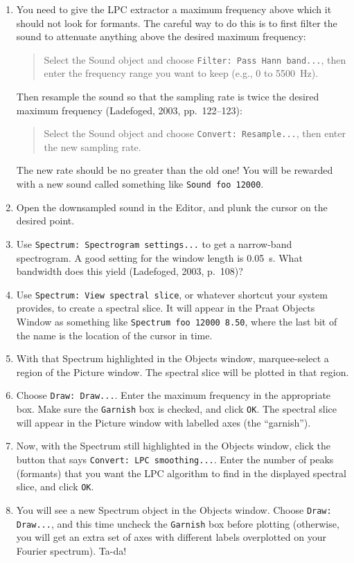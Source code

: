 \documentclass[12pt, letterpaper]{article}
\begin{document}
\begin{enumerate}[label=\arabic*.]
    \item You need to give the LPC extractor a maximum frequency above which it should not look for formants. The careful way to do this is to first filter the sound to attenuate anything above the desired maximum frequency:
    \begin{quote}
    Select the Sound object and choose \texttt{Filter: Pass Hann band...}, then enter the frequency range you want to keep (e.g., 0 to 5500~Hz).
    \end{quote}
    Then resample the sound so that the sampling rate is twice the desired maximum frequency (Ladefoged, 2003, pp.~122–123):
    \begin{quote}
    Select the Sound object and choose \texttt{Convert: Resample...}, then enter the new sampling rate.
    \end{quote}
    The new rate should be no greater than the old one! You will be rewarded with a new sound called something like \texttt{Sound foo 12000}.

    \item Open the downsampled sound in the Editor, and plunk the cursor on the desired point.

    \item Use \texttt{Spectrum: Spectrogram settings...} to get a narrow-band spectrogram. A good setting for the window length is 0.05~s. What bandwidth does this yield (Ladefoged, 2003, p.~108)?

    \item Use \texttt{Spectrum: View spectral slice}, or whatever shortcut your system provides, to create a spectral slice. It will appear in the Praat Objects Window as something like \texttt{Spectrum foo 12000 8.50}, where the last bit of the name is the location of the cursor in time.

    \item With that Spectrum highlighted in the Objects window, marquee-select a region of the Picture window. The spectral slice will be plotted in that region.

    \item Choose \texttt{Draw: Draw...}. Enter the maximum frequency in the appropriate box. Make sure the \texttt{Garnish} box is checked, and click \texttt{OK}. The spectral slice will appear in the Picture window with labelled axes (the “garnish”).

    \item Now, with the Spectrum still highlighted in the Objects window, click the button that says \texttt{Convert: LPC smoothing...}. Enter the number of peaks (formants) that you want the LPC algorithm to find in the displayed spectral slice, and click \texttt{OK}.

    \item You will see a new Spectrum object in the Objects window. Choose \texttt{Draw: Draw...}, and this time uncheck the \texttt{Garnish} box before plotting (otherwise, you will get an extra set of axes with different labels overplotted on your Fourier spectrum). Ta-da!
\end{enumerate}
\end{document}
